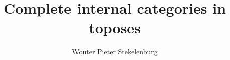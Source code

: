 \documentclass{tac}
\title{Complete internal categories in toposes}
\author{Wouter Pieter Stekelenburg}\copyrightyear{2015}
\newcommand\hide[1]{}
\begin{document}
\maketitle

\hide{
-goal
strong completeness of modest sets in asm_ex/lex

preservation of complete categories by ex/lex completions

-background
complete small categories are posets
complete internal categories in Grothendieck toposes are posets too

-strong and weak completeness

Not complete in every slice, only a dense subcategory where things are complete

-preservation of strong completeness by the ex/lex completion

}
\end{document}
